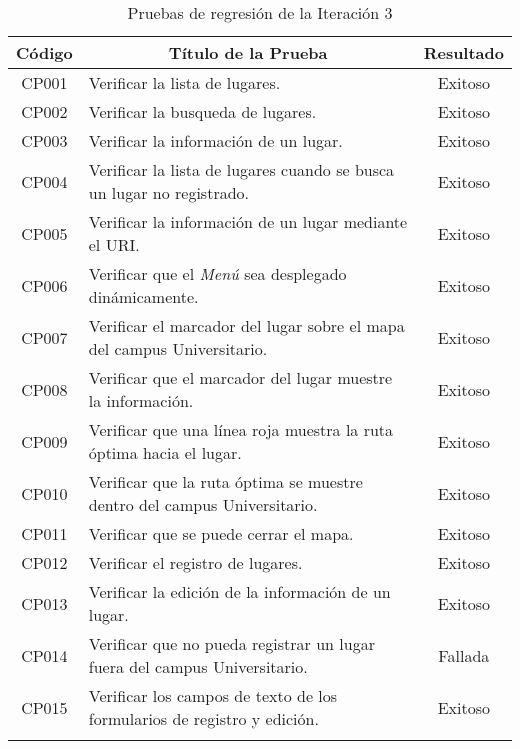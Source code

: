 
    \begin{longtable}{ c  X  c }
      \toprule
        \textbf{Código} &
        \multicolumn{1}{c}{\textbf{Título de la Prueba}} &
        \textbf{Resultado}\\

\midrule
CP001
&
Verificar la lista de lugares.
&
Exitoso \\

CP002
&
Verificar la busqueda de lugares.
&
Exitoso \\

CP003
&
Verificar la información de un lugar.
&
Exitoso \\

CP004
&
Verificar la lista de lugares cuando se busca un lugar no registrado.
&
Exitoso \\

CP005
&
Verificar la información de un lugar mediante el URI.
&
Exitoso \\

CP006
&
Verificar que el \emph{Menú} sea desplegado dinámicamente.
&
Exitoso \\

CP007
&
Verificar el marcador del lugar sobre el mapa del campus Universitario.
&
Exitoso \\

CP008
&
Verificar que el marcador del lugar muestre la información.
&
Exitoso \\


CP009
&
Verificar que una línea roja muestra la ruta óptima hacia el lugar.
&
Exitoso \\

CP010
&
Verificar que la ruta óptima se muestre dentro del campus Universitario.
&
Exitoso \\


CP011
&
Verificar que se puede cerrar el mapa.
&
Exitoso \\

CP012
&
Verificar el registro de lugares.
&
Exitoso \\

CP013
&
Verificar la edición de la información de un lugar.
&
Exitoso \\


CP014
&
Verificar que no pueda registrar un lugar fuera del campus Universitario.
&
Fallada \\

CP015
&
Verificar los campos de texto de los formularios de registro y edición.
&
Exitoso \\


      \bottomrule
    \caption{Pruebas de regresión de la Iteración 3}
    \label{tab:regresion_3}
  \end{longtable}
